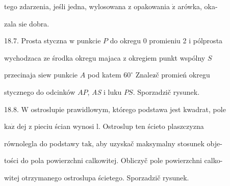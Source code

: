 \documentclass[a4paper,12pt]{article}
\begin{document}
tego zdarzenia, jeśli jedna, wylosowana $\mathrm{z}$ opakowania $\dot{\mathrm{z}}$ arówka, oka-

zala $\mathrm{s}\mathrm{i}\mathrm{e}$ dobra.

18.7. Prosta styczna $\mathrm{w}$ punkcie $P$ do okregu $0$ promieniu 2 $\mathrm{i}$ pólprosta

wychodzaca ze środka okregu majaca $\mathrm{z}$ okregiem punkt wspólny $S$

przecinaja $\mathrm{s}\mathrm{i}\mathrm{e}\mathrm{w}$ punkcie $A$ pod katem $60^{\circ}$ Znalez$\acute{}$č promień okregu

stycznego do odcinków $AP$, {\it AS} $\mathrm{i}$ luku $PS$. Sporzadzič rysunek.

18.8. $\mathrm{W}$ ostroslupie prawidlowym, którego podstawa jest kwadrat, pole

$\mathrm{k}\mathrm{a}\dot{\mathrm{z}}$ dej $\mathrm{z}$ pieciu ścian wynosi l. Ostroslup ten ścieto plaszczyzna

równolegla do podstawy $\mathrm{t}\mathrm{a}\mathrm{k}$, aby uzyskač maksymalny stosunek obje-

tości do pola powierzchni calkowitej. Obliczyč pole powierzchni calko-

witej otrzymanego ostroslupa ścietego. Sporzadzič rysunek.
\end{document}
